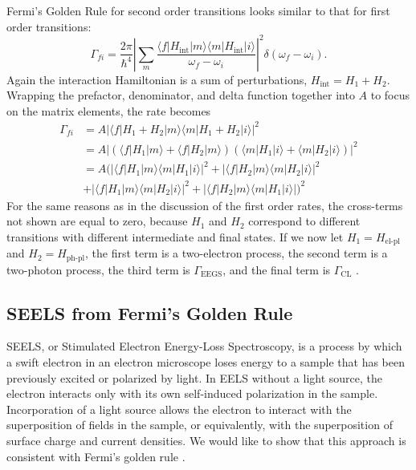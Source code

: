 \documentclass [11pt, proquest] {uwthesis}[2016/11/22]
\begin{document}
Fermi's Golden Rule for second order transitions looks similar to that for first order transitions:
\begin{equation}
\Gamma_{fi} = \frac{2\pi}{\hbar^4}\left|\sum_{m}\frac{\langle f |H_{\textrm{int}}| m \rangle \langle m |H_{\textrm{int}}| i \rangle }{\omega_f-\omega_i}\right|^2 \delta(\omega_f - \omega_i).
\label{FGR_2}
\end{equation}
Again the interaction Hamiltonian is a sum of perturbations, $H_{\textrm{int}} = H_1 + H_2$. Wrapping the prefactor, denominator, and delta function together into $A$ to focus on the matrix elements, the rate becomes
\begin{equation}
\begin{aligned}
\Gamma_{fi} &= A|\langle f |H_1 + H_2| m \rangle \langle m |H_1 + H_2| i \rangle|^2\\
&= A|(\langle f |H_1| m \rangle + \langle f |H_2| m \rangle) (\langle m |H_1| i \rangle + \langle m |H_2| i \rangle)|^2\\
&= A(|\langle f |H_1| m \rangle \langle m |H_1| i \rangle|^2 + |\langle f |H_2| m \rangle \langle m |H_2| i \rangle|^2\\
&+ |\langle f |H_1| m \rangle \langle m |H_2| i \rangle|^2 + |\langle f |H_2| m \rangle \langle m |H_1| i \rangle|)^2
\label{FGR_2_2}
\end{aligned}
\end{equation}
For the same reasons as in the discussion of the first order rates, the cross-terms not shown are equal to zero, because $H_1$ and $H_2$ correspond to different transitions with different intermediate and final states. If we now let $H_1 = H_\textrm{el-pl}$ and $H_2 = H_{\textrm{ph-pl}}$, the first term is a two-electron process, the second term is a two-photon process, the third term is $\Gamma_{\textrm{EEGS}}$, and the final term is $\Gamma_{\textrm{CL}}$ \cite{EEGS}.

\subsection{SEELS from Fermi's Golden Rule}
SEELS, or Stimulated Electron Energy-Loss Spectroscopy, is a process by which a swift electron in an electron microscope loses energy to a sample that has been previously excited or polarized by light. In EELS without a light source, the electron interacts only with its own self-induced polarization in the sample. Incorporation of a light source allows the electron to interact with the superposition of fields in the sample, or equivalently, with the superposition of surface charge and current densities. We would like to show that this approach is consistent with Fermi's golden rule \cite{vanAiken,EEGS}.
\end{document}
